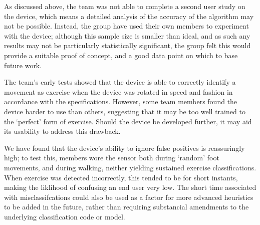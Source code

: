 
As discussed above, the team was not able to complete a second user study on the device, which means a detailed analysis of the accuracy of the algorithm may not be possible. Instead, the group have used their own members to experiment with the device; although this sample size is smaller than ideal, and as such any results may not be particularly statistically significant, the group felt this would provide a suitable proof of concept, and a good data point on which to base future work.

The team's early tests showed that the device is able to correctly identify a movement as exercise when the device was rotated in speed and fashion in accordance with the specifications. However, some team members found the device harder to use than others, suggesting that it may be too well trained to the `perfect' form of exercise. Should the device be developed further, it may aid its usability to address this drawback.

We have found that the device's ability to ignore false positives is reassuringly high; to test this, members wore the sensor both during `random' foot movements, and during walking, neither yielding sustained exercise classifications. When exercise was detected incorrectly, this tended to be for short instants, making the liklihood of confusing an end user very low. The short time associated with misclassifcations could also be used as a factor for more advanced heuristics to be added in the future, rather than requiring substancial amendments to the underlying classification code or model.